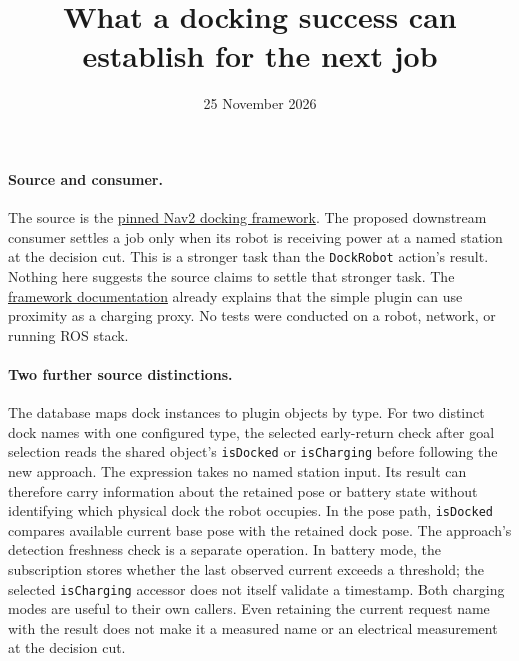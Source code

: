 \documentclass[11pt]{article}
\title{What a docking success can establish for the next job}
\date{25 November 2026}
\begin{document}
\maketitle
\paragraph{Source and consumer.}
The source is the \href{https://github.com/ros-navigation/navigation2/tree/346bd05f40b62ae60b96ba86e02eb491c8dba444/nav2_docking}{pinned Nav2 docking framework}. The proposed downstream consumer settles a job only when its robot is receiving power at a named station at the decision cut. This is a stronger task than the \texttt{DockRobot} action's result. Nothing here suggests the source claims to settle that stronger task. The \href{https://api.nav2.org/nav2-rolling/html/md_nav2_docking_README.html}{framework documentation} already explains that the simple plugin can use proximity as a charging proxy. No tests were conducted on a robot, network, or running ROS stack.
\paragraph{Two further source distinctions.}
The database maps dock instances to plugin objects by type. For two distinct dock names with one configured type, the selected early-return check after goal selection reads the shared object's \texttt{isDocked} or \texttt{isCharging} before following the new approach. The expression takes no named station input. Its result can therefore carry information about the retained pose or battery state without identifying which physical dock the robot occupies. In the pose path, \texttt{isDocked} compares available current base pose with the retained dock pose. The approach's detection freshness check is a separate operation. In battery mode, the subscription stores whether the last observed current exceeds a threshold; the selected \texttt{isCharging} accessor does not itself validate a timestamp. Both charging modes are useful to their own callers. Even retaining the current request name with the result does not make it a measured name or an electrical measurement at the decision cut.
\end{document}
